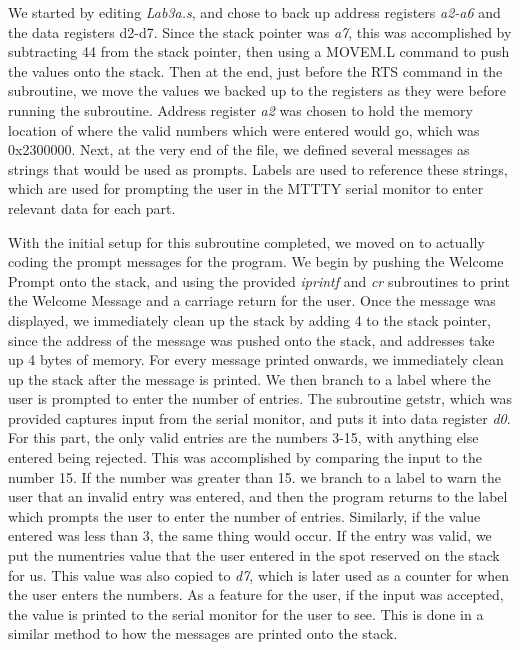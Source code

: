 \documentclass[letterpaper]{article}
\begin{document}
    We started by editing \textit{Lab3a.s}, and chose to back up
    address registers \textit{a2-a6} and the data registers d2-d7. Since the stack pointer
    was \textit{a7}, this was accomplished by subtracting 44 from the stack pointer,
    then using a MOVEM.L command to push the values onto the stack. Then at the end, just before
    the RTS command in the subroutine, we move the values we backed up to the registers
    as they were before running the subroutine. Address register \textit{a2} was chosen to
    hold the memory location of where the valid numbers which were entered would go, which
    was 0x2300000.
    Next, at the very end of the file, we
    defined several messages as strings that would be used as prompts. Labels are used to reference
    these strings, which are used for prompting the user in the MTTTY serial monitor to enter relevant data for each part.

    With the initial setup for this subroutine completed, we moved on to
    actually coding the prompt messages for the program. We begin by
    pushing the Welcome Prompt onto the stack, and using the provided \textit{iprintf}
    and \textit{cr} subroutines to print the Welcome Message and a carriage return for the
    user. Once the message was displayed, we immediately clean up the stack by adding 4
    to the stack pointer, since the address of the message was pushed onto the stack,
    and addresses take up 4 bytes of memory. For every message printed onwards,
    we immediately clean up the stack after the message is printed. We then branch to a label where the user
    is prompted to enter the number of entries. The subroutine getstr, which was provided captures input from the serial monitor,
    and puts it into data register \textit{d0}. For this part, the only
    valid entries are the numbers 3-15, with anything else entered being rejected.
    This was accomplished by comparing the input to the number 15. If the number was
    greater than 15. we branch to a label to warn the user that an invalid entry was entered,
    and then the program returns to the label which prompts the user to enter
    the number of entries. Similarly, if the value entered was less than 3, the same thing would occur.
    If the entry was valid, we put the numentries value that the user entered in the spot reserved on the
    stack for us. This value was also copied to \textit{d7}, which is later used as a counter
    for when the user enters the numbers. As a feature for the user, if the input was
    accepted, the value is printed to the serial monitor for the user to see. This is done
    in a similar method to how the messages are printed onto the stack.
\end{document}
